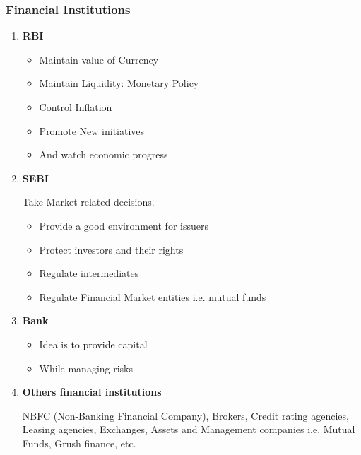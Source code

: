 \documentclass{article}
\begin{document}
\subsubsection{Financial Institutions}
\begin{enumerate}
    \item \textbf{RBI}
    \begin{itemize}
        \item Maintain value of Currency
        \item Maintain Liquidity: Monetary Policy
        \item Control Inflation
        \item Promote New initiatives
        \item And watch economic progress
    \end{itemize}
    
    \item \textbf{SEBI} \par
    Take Market related decisions.
    \begin{itemize}
        \item Provide a good environment for issuers
        \item Protect investors and their rights
        \item Regulate intermediates 
        \item Regulate Financial Market entities i.e. mutual funds 
    \end{itemize}

    \item \textbf{Bank}
    \begin{itemize}
        \item Idea is to provide capital
        \item While managing risks
    \end{itemize}
    
    \item \textbf{Others financial institutions}\par
    NBFC (Non-Banking Financial Company), Brokers, Credit rating agencies, Leasing agencies, Exchanges, Assets and Management companies i.e. Mutual Funds, Grush finance, etc.
\end{enumerate}
\end{document}

